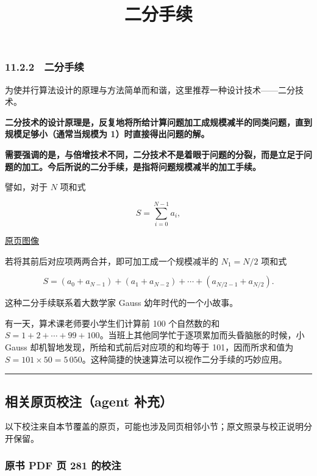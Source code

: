 \documentclass[
  10pt,
  fontset=fandol]{ctexart}
\title{二分手续}
\author{}
\date{}
\begin{document}
\maketitle

\subsubsection{11.2.2　二分手续}\label{ux4e8cux5206ux624bux7eed}

为使并行算法设计的原理与方法简单而和谐，这里推荐一种设计技术------二分技术。

\textbf{二分技术的设计原理是，反复地将所给计算问题加工成规模减半的同类问题，直到规模足够小（通常当规模为 1）时直接得出问题的解。}

\textbf{需要强调的是，与倍增技术不同，二分技术不是着眼于问题的分裂，而是立足于问题的加工。今后所说的二分手续，是指将问题规模减半的加工手续。}

譬如，对于 \(N\) 项和式

\[
S=\sum_{i=0}^{N-1}a_i,
\]

\href{../../source-images/pdf-281.jpeg}{原页图像}

若将其前后对应项两两合并，即可加工成一个规模减半的 \(N_1=N/2\) 项和式

\[
S=(a_0+a_{N-1})+(a_1+a_{N-2})+\cdots+(a_{N/2-1}+a_{N/2}).
\]

这种二分手续联系着大数学家 Gauss 幼年时代的一个小故事。

有一天，算术课老师要小学生们计算前 100 个自然数的和 \(S=1+2+\cdots+99+100\)。当班上其他同学忙于逐项累加而头昏脑胀的时候，小 Gauss 却机智地发现，所给和式前后对应项的和均等于 101，因而所求和值为 \(S=101\times50=5\,050\)。这种简捷的快速算法可以视作二分手续的巧妙应用。

\begin{center}\rule{0.5\linewidth}{0.5pt}\end{center}

\subsection{相关原页校注（agent 补充）}\label{ux76f8ux5173ux539fux9875ux6821ux6ce8agent-ux8865ux5145}

以下校注来自本节覆盖的原页，可能也涉及同页相邻小节；原文照录与校正说明分开保留。

\subsubsection{原书 PDF 页 281 的校注}\label{ux539fux4e66-pdf-ux9875-281-ux7684ux6821ux6ce8}
\end{document}
